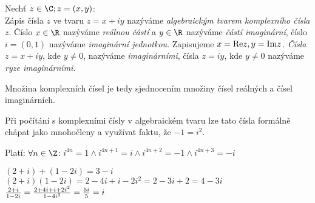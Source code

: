 \Def Nechť $z\in \C;z=(x,y)$:\\
 Zápis čísla $z$ ve tvaru $z=x+iy$ nazýváme
 \emph{algebraickým tvarem komplexního čísla} $z$.
 Číslo $x\in\R$ nazýváme \emph{reálnou částí} a $y\in\R$ nazýváme \emph{částí imaginární}, číslo $i=(0,1)$ nazýváme \emph{imaginární jednotkou}.
 Zapisujeme $x = {\rm Re} z, y = {\rm Im} z$.
 \emph{Čísla} $z=x+iy$, kde $y\neq 0$, nazýváme \emph{imaginárními}, čísla $z=iy$, kde $y\neq 0$ nazýváme \emph{ryze imaginárními}.

 \Poz Množina komplexních čísel je tedy sjednocením množiny čísel reálných a čísel imaginárních. 

 \Poz  Při počítání s komplexními čísly v algebraickém tvaru lze tato čísla formálně chápat jako mnohočleny
a využívat faktu, že $-1= i^2$.

\Poz Platí: $\forall n \in \Z$: $i^{4n} = 1 \land i^{4n+1} = i \land i^{4n+2} = - 1 \land i^{4n+3} = -i$

\Pr 
$(2+i)+(1-2i) = 3-i$\\
$(2+i)(1-2i) = 2  - 4i + i - 2i^2 = 2-3i+2 = 4-3i$\\
$\frac{2+i}{1-2i} = \frac{2+4i+i+2i^2}{1-4i^2} = \frac{5i}5 = i$


\EndDoc
